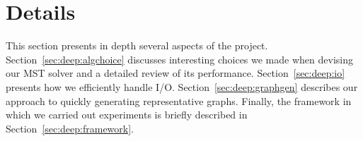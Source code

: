 \section{Details}
\label{sec:deep}
This section presents in depth several aspects of the project.
Section~\ref{sec:deep:algchoice} discusses interesting choices we made when
devising our MST solver and a detailed review of its performance.
Section~\ref{sec:deep:io} presents how we efficiently handle I/O.
Section~\ref{sec:deep:graphgen} describes our approach to quickly generating
representative graphs.  Finally, the framework in which we carried out
experiments is briefly described in Section~\ref{sec:deep:framework}.





